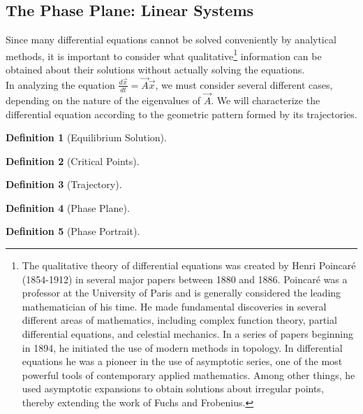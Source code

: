 \documentclass[10pt]{report}
\newtheorem{def3}{Definition}[subsection]
\begin{document}
\subsection{The Phase Plane: Linear Systems}
Since many differential equations cannot be solved conveniently by analytical methods, it is important to consider what qualitative\footnote{The qualitative theory of differential equations was created by Henri Poincar\'{e} (1854-1912) in several major papers between 1880 and 1886. Poincar\'{e} was a professor at the University of Paris and is generally considered the leading mathematician of his time. He made fundamental discoveries in several different areas of mathematics, including complex function theory, partial differential equations, and celestial mechanics. In a series of papers beginning in 1894, he initiated the use of modern methods in topology. In differential equations he was a pioneer in the use of asymptotic series, one of the most powerful tools of contemporary applied mathematics. Among other things, he used asymptotic expansions to obtain solutions about irregular points, thereby extending the work of Fuchs and Frobenius.} information can be obtained about their solutions without actually solving the equations.\\
In analyzing the equation $\frac{d\vec{x}}{dt} = \vec{A}\vec{x}$, we must consider several different cases, depending on the nature of the eigenvalues of $\vec{A}$. We will characterize the differential equation according to the geometric pattern formed by its trajectories. 
\begin{def3}[Equilibrium Solution]
\end{def3}
\begin{def3}[Critical Points]
\end{def3}
\begin{def3}[Trajectory]
\end{def3}
\begin{def3}[Phase Plane]
\end{def3}
\begin{def3}[Phase Portrait]
\end{def3}
\end{document}
